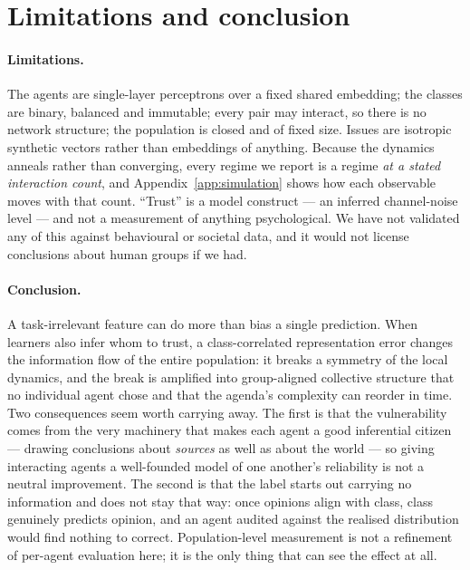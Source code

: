 \section{Limitations and conclusion}
\label{sec:conclusion}

\paragraph{Limitations.} The agents are single-layer perceptrons over a fixed
shared embedding; the classes are binary, balanced and immutable; every pair may
interact, so there is no network structure; the population is closed and of fixed
size. Issues are isotropic synthetic vectors rather than embeddings of anything.
Because the dynamics anneals rather than converging, every regime we report is a
regime \emph{at a stated interaction count}, and Appendix~\ref{app:simulation}
shows how each observable moves with that count. ``Trust'' is a model construct
--- an inferred channel-noise level --- and not a measurement of anything
psychological. We have not validated any of this against behavioural or societal
data, and it would not license conclusions about human groups if we had.

\paragraph{Conclusion.} A task-irrelevant feature can do more than bias a single
prediction. When learners also infer whom to trust, a class-correlated
representation error changes the information flow of the entire population: it
breaks a symmetry of the local dynamics, and the break is amplified into
group-aligned collective structure that no individual agent chose and that the
agenda's complexity can reorder in time. Two consequences seem worth carrying
away. The first is that the vulnerability comes from the very machinery that
makes each agent a good inferential citizen --- drawing conclusions about
\emph{sources} as well as about the world --- so giving interacting agents a
well-founded model of one another's reliability is not a neutral improvement.
The second is that the label starts out carrying no information and does not stay
that way: once opinions align with class, class genuinely predicts opinion, and
an agent audited against the realised distribution would find nothing to correct.
Population-level measurement is not a refinement of per-agent evaluation here; it
is the only thing that can see the effect at all.
